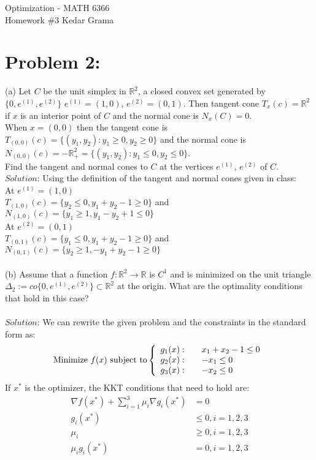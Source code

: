 \documentclass[12pt]{report}
\begin{document}
\begin{center}
	\large{Optimization - MATH 6366}\\
	\hfill \hfill \large{Homework \#3} \hfill \large{Kedar Grama}\\
\end{center}

\section*{Problem 2:}
(a) Let $C$ be the unit simplex in $\mathbb{R}^2$, a closed convex set generated by $\{ 0,
e^{(1)}, e^{(2)} \}$ $e^{(1)}=(1,0)$, $e^{(2)}=(0,1)$. Then tangent cone
$T_x(c) = \mathbb{R}^2$ if $x$ is an interior point of $C$ and the normal cone is
$N_x(C)=0$.\\
When $x=(0,0)$ then the tangent cone is $T_{(0,0)}(c) = \{ (y_1,y_2):y_1\geq 0, y_2\geq 0 \}$
and the normal cone is $N_{(0,0)}(c) = -\mathbb{R}^2_+ = \{(y_1,y_2):y_1\leq 0, y_2\leq 0 \}$.
\\ Find the tangent and normal cones to $C$ at the vertices $e^{(1)}$, $e^{(2)}$ of $C$.\\ 
$Solution$: Using the definition of the tangent and normal cones given in class:\\
At $e^{(1)}=(1,0)$\\
$T_{(1,0)}(c) = \{ y_2 \leq 0 , y_1+y_2-1 \geq 0 \}$ and \\
$N_{(1,0)}(c) = \{ y_1 \geq 1 , y_1-y_2+1 \leq 0 \}$ \\
At $e^{(2)}=(0,1)$\\
$T_{(0,1)}(c) = \{ y_1 \leq 0 , y_1+y_2-1 \geq 0 \}$ and \\
$N_{(0,1)}(c) = \{ y_2 \geq 1 , -y_1+y_2-1 \geq 0 \}$\\
\\
(b) Assume that a function $f : \mathbb{R}^2 \rightarrow \mathbb{R}$ is $C^1$ and is minimized
on the unit triangle $\Delta_2 := co\{ 0, e^{(1)} , e^{(2)} \} \subset \mathbb{R}^2$ at the
origin. What are the optimality conditions that hold in this case? \\ \\
$Solution$: We can rewrite the given problem and the constraints in the standard form as:
\begin{equation*}
\text{Minimize $f(x)$ subject to}\left\{
  \begin{array}{l l}
    g_1(x): & \quad x_1+x_2-1 \leq 0\\
    g_2(x): & \quad -x_1 \leq 0 \\
    g_3(x): & \quad -x_2 \leq 0 \\
  \end{array} \right.
\end{equation*}
If $x^*$ is the optimizer, the KKT conditions that need to hold are:
\begin{align*}
\nabla f(x^*) + \sum_{i=1}^3 \mu_i \nabla g_i(x^*) &= 0 \\
g_i(x^*) & \leq 0 , i=1,2,3\\
\mu_i & \geq 0 , i=1,2,3\\
\mu_i g_i(x^*) &= 0, i=1,2,3
\end{align*}
\end{document}
